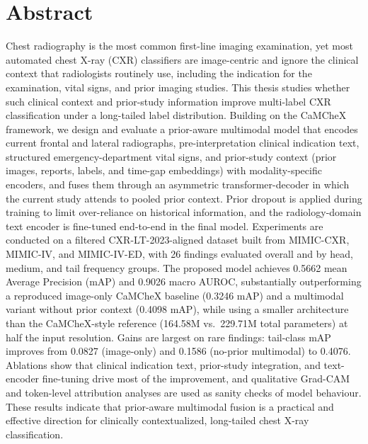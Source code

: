 \section*{Abstract}
\label{sec:abstract}

Chest radiography is the most common first-line imaging examination, yet most automated chest X-ray (CXR) classifiers are image-centric and ignore the clinical context that radiologists routinely use, including the indication for the examination, vital signs, and prior imaging studies. This thesis studies whether such clinical context and prior-study information improve multi-label CXR classification under a long-tailed label distribution. Building on the CaMCheX framework, we design and evaluate a prior-aware multimodal model that encodes current frontal and lateral radiographs, pre-interpretation clinical indication text, structured emergency-department vital signs, and prior-study context (prior images, reports, labels, and time-gap embeddings) with modality-specific encoders, and fuses them through an asymmetric transformer-decoder in which the current study attends to pooled prior context. Prior dropout is applied during training to limit over-reliance on historical information, and the radiology-domain text encoder is fine-tuned end-to-end in the final model. Experiments are conducted on a filtered CXR-LT-2023-aligned dataset built from MIMIC-CXR, MIMIC-IV, and MIMIC-IV-ED, with 26 findings evaluated overall and by head, medium, and tail frequency groups. The proposed model achieves 0.5662 mean Average Precision (mAP) and 0.9026 macro AUROC, substantially outperforming a reproduced image-only CaMCheX baseline (0.3246 mAP) and a multimodal variant without prior context (0.4098 mAP), while using a smaller architecture than the CaMCheX-style reference (164.58M vs.\ 229.71M total parameters) at half the input resolution. Gains are largest on rare findings: tail-class mAP improves from 0.0827 (image-only) and 0.1586 (no-prior multimodal) to 0.4076. Ablations show that clinical indication text, prior-study integration, and text-encoder fine-tuning drive most of the improvement, and qualitative Grad-CAM and token-level attribution analyses are used as sanity checks of model behaviour. These results indicate that prior-aware multimodal fusion is a practical and effective direction for clinically contextualized, long-tailed chest X-ray classification.